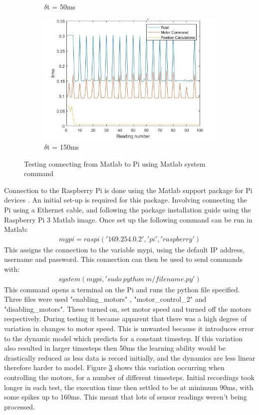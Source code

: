 \documentclass[twoside,twocolumn,12pt]{article}
\begin{document}
\begin{figure}[t]
\begin{subfigure}[t]{0.325\textwidth}
    \caption{$\delta$t = 50ms}
  \label{fig:pi50}
  \end{subfigure}
  \begin{subfigure}[t]{0.325\textwidth}
    \includegraphics[width=\linewidth]{150ms_pi}
    \caption{$\delta$t = 150ms}
  \label{fig:pi150}
  \end{subfigure}
  \caption{Testing connecting from Matlab to Pi using Matlab system command}
  \label{fig:pi}
\end{figure}
Connection to the Raspberry Pi is done using the Matlab support package for Pi devices \cite{pi}. An initial set-up is required for this package. Involving connecting the Pi using a Ethernet cable, and following the package installation guide using the Raspberry Pi 3 Matlab image. Once set up the following command can be run in Matlab:
\begin{gather}
mypi = raspi('169.254.0.2', 'pi', 'raspberry') \nonumber
\end{gather}
This assigns the connection to the variable mypi, using the default IP address, username and password. This connection can then be used to send commands with:
\begin{gather}
system(mypi, 'sudo \: python \: m/filename.py') \nonumber
\end{gather}
This command opens a terminal on the Pi and runs the python file specified. Three files were used \cite{motorcmd} "enabling\_motors" , "motor\_control\_2" and "disabling\_motors". These turned on, set motor speed and turned off the motors respectively.
\newline
During testing it became apparent that there was a high degree of variation in changes to motor speed. This is unwanted because it introduces error to the dynamic model which predicts for a constant timestep. If this variation also resulted in larger timesteps then 50ms the learning ability would be drastically reduced as less data is record initially, and the dynamics are less linear therefore harder to model. Figure \ref{fig:pi} shows this variation occurring when controlling the motors, for a number of different timesteps. Initial recordings took longer in each test, the execution time then settled to be at minimum 90ms, with some spikes up to 160ms. This meant that lots of sensor readings weren't being processed.
\end{document}
